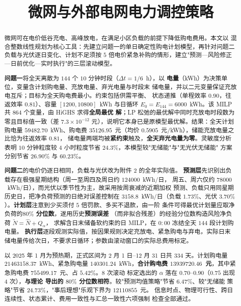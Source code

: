\documentclass[withoutpreface,bwprint]{cumcmthesis}
\title{微网与外部电网电力调控策略}
\begin{document}
\maketitle

\begin{abstract}

微网可在电价低谷充电、高峰放电，在满足小区负载的前提下降低购电费用。本文以
混合整数线性规划为核心工具：先建立问题一的单日确定性购电计划模型，再针对问题二
负载与光伏逐日变化、计划不足须按 $5$ 倍电价紧急补购的情形，建立"预测—风险修正
—日前优化—实时执行"的三层滚动模型。

\textbf{问题一}将全天离散为 $144$ 个 $10$ 分钟时段（$\Delta t = 1/6$~h），以
\textbf{电量}（kWh）为决策单位，变量含计划购电量、充放电量、弃光电量与时段末
储电量，并以二元变量保证充放电互斥；目标为全天购电费最小。约束包括供需平衡、
状态递推（单程效率 $0.90$，往返效率 $0.81$）、容量 $[1200,10800]$~kWh 与日循环
$E_0=E_{144}=6000$~kWh。该 MILP 共 $864$ 个变量，由 HiGHS 求得\textbf{全局最优
解}；LP 松弛的最优解中同时充放电时段数为零且目标值一致（差 $7.3\times10^{-12}$
元），说明它本身已是原模型最优解。结果：全天计划购电量 $59482.70$~kWh、购电费
$35126.95$~元（均价 $0.5905$~元/kWh），储能充放电量之比恰为往返效率 $0.81$，
储电量两端均被\textbf{紧约束}触及，\textbf{全天弃光电量为零}。灵敏度分析表明
$10$ 分钟粒度较 $4$ 小时粒度节省 $24.3\%$，本模型较"无储能"与"无光伏无储能"
方案分别节省 $26.90\%$ 与 $60.23\%$。

\textbf{问题二}的电价仍逐日相同，负载与光伏改为附件 2 的全年实际值。
\textbf{预测层}先识别出负载存在极强星期结构（周一至周四及周日约 $124000$~kWh/日，
周五、周六仅约 $78000$~kWh/日），而光伏以季节性为主，故采用按周衰减的近期加权
预测、负载只用同星期历史日，把净负荷预测的日绝对误差控制在
$3158.8$~kWh/日（负载 $1.73\%$、光伏 $3.70\%$）。\textbf{计划层}注意到少买须付 $5$ 倍罚款、多买不退款，由一阶
条件可得最优计划量应取净负荷的\textbf{$80\%$ 分位数}，遂用历史\textbf{预测误差}
（而非拟合残差）的经验分位数构造风险净负荷 $\widetilde N=\widehat N+Q_{\alpha}$，
求解含日末储备软约束的日 MILP，在 $0{:}00$ 冻结全天 $144$ 段计划购电量。
\textbf{执行层}逐段观测实际值，按因果规则决定充放电、紧急购电与弃电，实际日末
储电量传给次日，不要求日循环；参数由滚动窗口的实际总费用标定。

以 2025 年 1 月为预热期，正式区间为 2 月 1 日--12 月 31 日共 $334$ 天。计划购电量
$21463158.37$~kWh、紧急购电量 $140301.24$~kWh，\textbf{合计购电费
$13939720.46$~元}，其中紧急购电费 $755499.17$~元、占 $5.42\%$。$8$ 次滚动
标定选出的 $\alpha$ 落在 $0.70$--$0.90$（$0.75$ 出现 $4$ 次），\textbf{与理论
导出的 $80\%$ 分位数相符}。较"预测均值策略"节省 $6.47\%$、较"无储能
策略"节省 $24.73\%$，"事后理想"乐观下界为 $12110855$~元。
信息时点、物理可行性、跨日连续性、状态累计、费用一致性与汇总一致性六项强制
检查全部通过。


\end{abstract}
\end{document}
